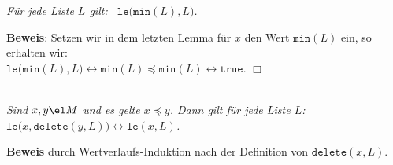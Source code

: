 \begin{Korollar} \label{l3}
{\em
  F\"ur jede Liste $L$ gilt: \ $\mathtt{le}\bigl(\mathtt{min}(L), L\bigr)$.
}
\end{Korollar}
\textbf{Beweis}: Setzen wir in dem letzten Lemma f\"ur $x$ den Wert $\mathtt{min}(L)$ ein,
so erhalten wir: \\[0.1cm]
\hspace*{1.3cm}
 $\mathtt{le}\bigl(\mathtt{min}(L), L) \leftrightarrow \mathtt{min}(L) \preceq \texttt{min}(L) \leftrightarrow \mathtt{true}$. 
\hspace*{\fill} $\Box$

\begin{Lemma} 
\label{l4} \hspace*{\fill} \\
{\em
  Sind  $x,y \el M$  und es gelte $x \preceq y$.  Dann gilt f\"ur jede Liste $L$: \\[0.1cm]
  \hspace*{1.3cm} $\mathtt{le}\bigl(x,\mathtt{delete}(y,L)\bigr) \leftrightarrow \mathtt{le}(x, L)$.
}
\end{Lemma}
\textbf{Beweis} durch Wertverlaufs-Induktion nach der Definition von $\mathtt{delete}(x,L)$.
